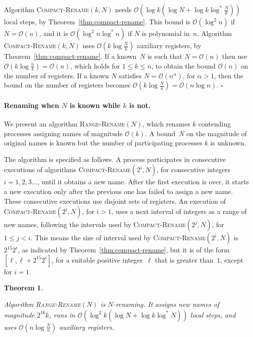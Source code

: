 \documentclass[11pt]{article}
\newcommand{\BBB}{\vspace*{-\bigskipamount}}
\newcommand{\cO}{\mathcal{O}}
\newcommand{\Paragraph}[1]{\BBB\paragraph{#1}}
\newcommand{\qed}{\hfill $\square$ \smallbreak}
\newenvironment{proof}{\noindent{\bf Proof:}}{\qed}
\newtheorem{theorem}{Theorem}
\begin{document}
\begin{proof}
Algorithm \textsc{Compact-Rename}$(k,N)$ needs $\cO(\log k (\log N + \log k\log^* \frac{N}{k}))$ local steps, by Theorem~\ref{thm:compact-rename}.
This bound is $\cO(\log^2 n)$ if  $N=\cO(n)$, and it is $\cO(\log^2 n \log^* n)$  if $N$ is polynomial in~$n$.
Algorithm \textsc{Compact-Rename}$(k,N)$ uses $\cO(k\log\frac{N}{k})$ auxiliary registers, by Theorem~\ref{thm:compact-rename}.
If a known~$N$ is such that $N=\cO(n)$ then use $\cO(k\log\frac{n}{k})=\cO(n)$, which holds for $1\le k\le n$, to obtain the bound $\cO(n)$ on the number of registers.  
If a known $N$ satisfies $N=\cO(n^\alpha)$, for $\alpha> 1$, then the bound on the number of registers becomes $\cO(k\log\frac{N}{k})=\cO(n\log n)$.
\end{proof}



\Paragraph{Renaming when $N$ is known while $k$ is not.}


We present an algorithm  \textsc{Range-Rename}$(N)$, which renames $k$ contending processes assigning names of magnitude $\cO(k)$.
A bound~$N$ on the magnitude of original names is known but the number of participating processes $k$ is unknown. 

The algorithm is specified as follows.
A process participates in consecutive executions of algorithms \textsc{Compact-Rename}$(2^i,N)$, for consecutive integers $i=1,2,3\ldots$, until it obtains a new name. 
After the first execution is over, it starts a new execution only after the previous one has failed to assign a new name.
These consecutive executions use disjoint  sets of registers.
An execution of \textsc{Compact-Rename}$(2^i,N)$, for $i>1$, uses a next  interval of integers as a range of new names, following the intervals used by \textsc{Compact-Rename}$(2^j,N)$, for $1\le j<i$. 
This means the size of interval used by \textsc{Compact-Rename}$(2^i,N)$ is $2^{15} 2^i$, as indicated by Theorem~\ref{thm:compact-rename}, but it is of the form $[\ell, \ell + 2^{15} 2^i]$, for a suitable positive integer~$\ell$ that is greater than~$1$, except for $i=1$.




\begin{theorem}
\label{thm:range-rename}

Algorithm \textsc{Range-Rename}$(N)$ is $N$-renaming.
It assigns new names of magnitude $2^{16}k$, runs in $\cO(\log^2 k (\log N + \log k\log^\ast N))$ local steps, and uses $\cO(n\log\frac{N}{n})$ auxiliary registers.
\end{theorem}
\end{document}

